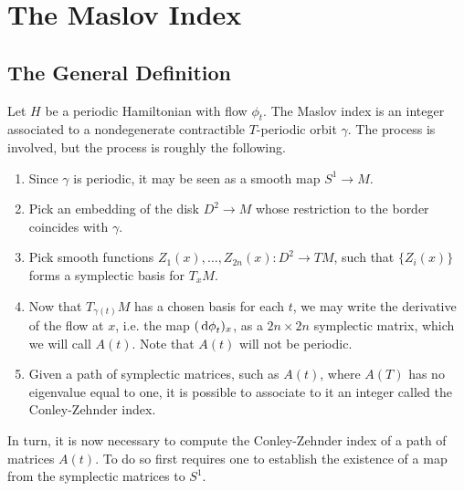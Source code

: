 \section{The Maslov Index}

\subsection{The General Definition}

Let $H$ be a periodic Hamiltonian with flow $\phi_t$. The Maslov index is an integer associated to a nondegenerate contractible $T$-periodic orbit $\gamma$. The process is involved, but the process is roughly the following.
\begin{enumerate}[algorithm]\label{page:maslovalg}
\item\label{maslovalg:step1} Since $\gamma$ is periodic, it may be seen as a smooth map $S^1 \to M$.
\item Pick an embedding of the disk $D^2 \to M$ whose restriction to the border coincides with $\gamma$.
\item Pick smooth functions $Z_1(x), \dots, Z_{2n}(x) \colon D^2 \to TM$, such that $\{Z_i(x)\}$ forms a symplectic basis for $T_x M$.
\item Now that $T_{\gamma(t)} M$ has a chosen basis for each $t$, we may write the derivative of the flow at $x$, i.e. the map $(\dl \phi_t)_x$, as a $2n \times 2n$ symplectic matrix, which we will call $A(t)$. Note that $A(t)$ will not be periodic.
\item\label{maslovalg:step5} Given a path of symplectic matrices, such as $A(t)$, where $A(T)$ has no eigenvalue equal to one, it is possible to associate to it an integer called the Conley-Zehnder index.
\end{enumerate}

In turn, it is now necessary to compute the Conley-Zehnder index of a path of matrices $A(t)$. To do so first requires one to establish the existence of a map from the symplectic matrices to $S^1$.

